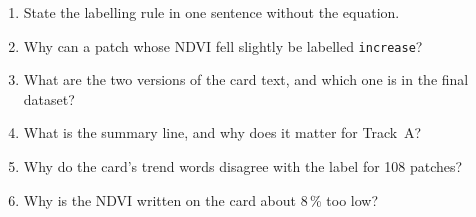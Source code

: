 \begin{selfcheck}
\begin{enumerate}
  \item State the labelling rule in one sentence without the equation.
  \item Why can a patch whose NDVI fell slightly be labelled \texttt{increase}?
  \item What are the two versions of the card text, and which one is in the final dataset?
  \item What is the summary line, and why does it matter for Track~A?
  \item Why do the card's trend words disagree with the label for 108 patches?
  \item Why is the NDVI written on the card about 8\,\% too low?
\end{enumerate}
\end{selfcheck}

